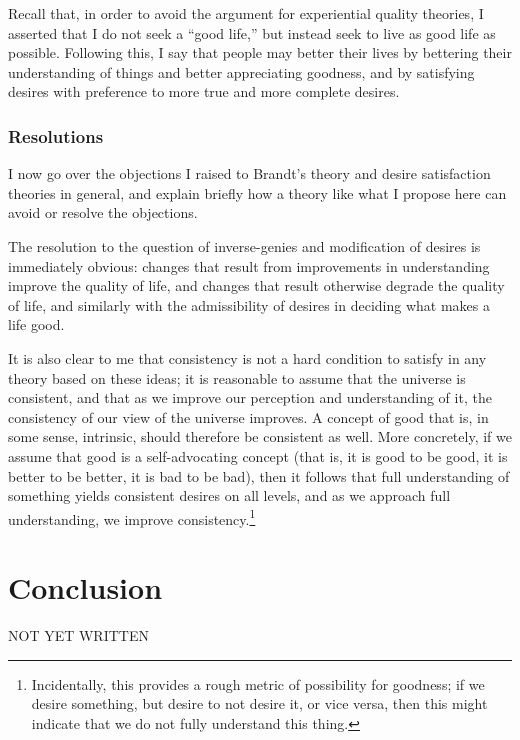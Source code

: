 \documentclass[letterpaper,11pt,twoside]{article}
\begin{document}
  Recall that, in order to avoid the argument for experiential quality theories, I asserted that I do not seek a ``good life,'' but instead seek to live as good life as possible.  Following this, I say that people may better their lives by bettering their understanding of things and better appreciating goodness, and by satisfying desires with preference to more true and more complete desires.


  \subsubsection*{Resolutions}
    I now go over the objections I raised to Brandt's theory and desire satisfaction theories in general, and explain briefly how a theory like what I propose here can avoid or resolve the objections.

    The resolution to the question of inverse-genies and modification of desires is immediately obvious: changes that result from improvements in understanding improve the quality of life, and changes that result otherwise degrade the quality of life, and similarly with the admissibility of desires in deciding what makes a life good.

    It is also clear to me that consistency is not a hard condition to satisfy in any theory based on these ideas; it is reasonable to assume that the universe is consistent, and that as we improve our perception and understanding of it, the consistency of our view of the universe improves.  A concept of good that is, in some sense, intrinsic, should therefore be consistent as well.  More concretely, if we assume that good is a self-advocating concept (that is, it is good to be good, it is better to be better, it is bad to be bad), then it follows that full understanding of something yields consistent desires on all levels, and as we approach full understanding, we improve consistency.\footnote{Incidentally, this provides a rough metric of possibility for goodness; if we desire something, but desire to not desire it, or vice versa, then this might indicate that we do not fully understand this thing.}

\section*{Conclusion}
  NOT YET WRITTEN
  \makeatletter{}\makeatother

\clearpage
\printbibliography

\appendix
\end{document}
